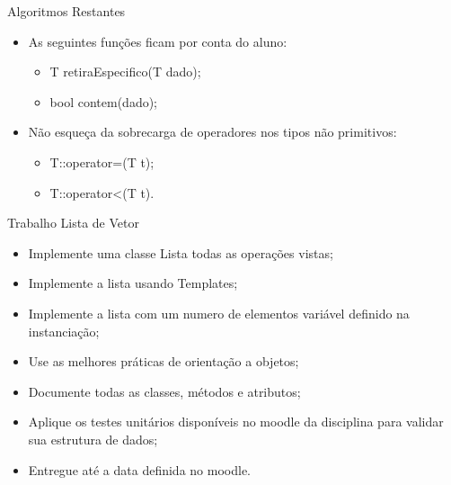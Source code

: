 \documentclass[12pt,table,xcolor={dvipsnames}]{beamer}
\begin{document}
\begin{frame}[fragile]{Algoritmos Restantes}
\begin{itemize}
\item As seguintes funções ficam por conta do aluno:
\begin{itemize}
\item T retiraEspecifico(T dado);
\item bool contem(dado);
\end{itemize}
\item Não esqueça da sobrecarga de operadores nos tipos não primitivos:
\begin{itemize}
\item  T::operator=(T t);
\item  T::operator<(T t).
\end{itemize}

\end{itemize}
\end{frame}


\begin{frame}[fragile]{Trabalho Lista de Vetor}
\begin{itemize}
\item Implemente uma classe Lista todas as operações vistas;
\item Implemente a lista usando Templates;
\item Implemente a lista com um numero de elementos variável definido na instanciação;
\item Use as melhores práticas de orientação a objetos;
\item Documente todas as classes, métodos e atributos;
\item Aplique os testes unitários disponíveis no moodle da disciplina para validar sua estrutura de dados;
\item Entregue até a data definida no moodle.
\end{itemize}
\end{frame}
\end{document}
